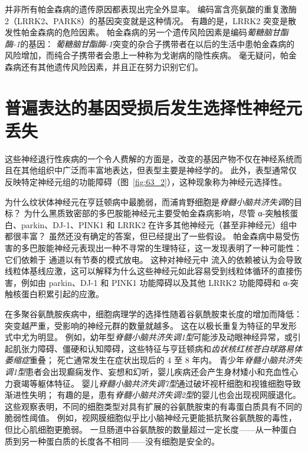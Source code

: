 并非所有帕金森病的遗传原因都表现出完全外显率。
编码富含亮氨酸的重复激酶 2（LRRK2、PARK8）的基因突变就是这种情况。
有趣的是，LRRK2 突变是散发性帕金森病的危险因素。
帕金森病的另一个遗传风险因素是编码\textit{葡糖脑甘酯酶-1}的基因：
\textit{葡糖脑甘酯酶-1}突变的杂合子携带者在以后的生活中患帕金森病的风险增加，而纯合子携带者会患上一种称为戈谢病的隐性疾病。
毫无疑问，帕金森病还有其他遗传风险因素，并且正在努力识别它们。



\section{普遍表达的基因受损后发生选择性神经元丢失}

这些神经退行性疾病的一个令人费解的方面是，改变的基因产物不仅在神经系统而且在其他组织中广泛而丰富地表达，但表型主要是神经学的。
此外，表型通常仅反映特定神经元组的功能障碍（图~\ref{fig:63_2}），这种现象称为神经元选择性。


为什么纹状体神经元在亨廷顿病中最脆弱，而浦肯野细胞是\textit{脊髓小脑共济失调}的目标？
为什么黑质致密部的多巴胺能神经元主要受帕金森病影响，尽管 α-突触核蛋白、parkin、DJ-1、PINK1 和 LRRK2 在许多其他神经元（甚至非神经元）组中都很丰富？
虽然还没有确定的答案，但已经提出了一些假设。
帕金森病中易受伤害的多巴胺能神经元表现出一种不寻常的生理特征，这一发现表明了一种可能性：
它们依赖于  通道以有节奏的模式放电。
这种对神经元中  流入的依赖被认为会导致线粒体基线应激，这可以解释为什么这些神经元如此容易受到线粒体循环的直接伤害，例如由 parkin、DJ-1 和 PINK1 功能障碍以及其他 LRRK2 功能障碍和 α-突触核蛋白积累引起的应激。


在多聚谷氨酰胺疾病中，细胞病理学的选择性随着谷氨酰胺束长度的增加而降低：
突变越严重，受影响的神经元群的数量就越多。
这在以极长重复为特征的早发形式中尤为明显。
例如，幼年型\textit{脊髓小脑共济失调1型}可能涉及动眼神经异常，或引起肌张力障碍、僵硬和认知障碍，这些特征与亨廷顿病和\textit{齿状核红核苍白球路易体萎缩症}重叠；
死亡通常发生在症状出现后的 4 至 8 年内。
青少年\textit{脊髓小脑共济失调1型}患者会出现癫痫发作、妄想和幻听，婴儿疾病还会产生身材矮小和充血性心力衰竭等躯体特征。
婴儿\textit{脊髓小脑共济失调7型}通过破坏视杆细胞和视锥细胞导致渐进性失明；
有趣的是，患有\textit{脊髓小脑共济失调2型}的婴儿也会出现视网膜退化。
这些观察表明，不同的细胞类型对具有扩展的谷氨酰胺束的有毒蛋白质具有不同的脆弱性阈值。
例如，视网膜细胞似乎比小脑神经元更能抵抗聚谷氨酰胺的毒性，但比心肌细胞更脆弱。
一旦肠道中谷氨酰胺的数量超过一定长度——从一种蛋白质到另一种蛋白质的长度各不相同——没有细胞是安全的。


